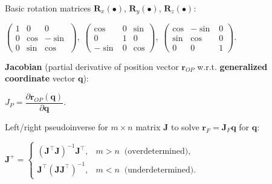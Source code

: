 \documentclass[8pt,landscape]{article}
\newcommand{\vmspace}{\vspace{-7pt}}
\newcommand{\vpspace}{\vspace{9pt}}
\begin{document}
\begin{multicols}{3}
\begin{minipage}{\columnwidth}
  Basic rotation matrices $\mathbf R_x(\bullet)$, $\mathbf R_y(\bullet)$, $\mathbf
  R_z(\bullet)$:
  \vmspace
  \begin{center}
    $\left(\begin{matrix}
      1 & 0 & 0 \\
      0 & \cos & -\sin \\
      0 & \sin & \cos
    \end{matrix}\right),\;
    \left(\begin{matrix}
      \cos & 0 & \sin \\
      0 & 1 & 0 \\
      -\sin & 0 & \cos
    \end{matrix}\right),\;
    \left(\begin{matrix}
      \cos & -\sin & 0 \\
      \sin & \cos & 0 \\
      0 & 0 & 1
    \end{matrix}\right).$
  \end{center}
\end{minipage}

\vpspace

\begin{minipage}{\columnwidth}
  \textbf{Jacobian} (partial derivative of position vector $\mathbf{r}_{OP}$
  w.r.t. \textbf{generalized coordinate} vector $\mathbf{q}$):
  \vmspace
  \begin{center}
    $J_P = \dfrac{\partial \mathbf{r}_{OP}(\mathbf q)}{\partial \mathbf q}$.
  \end{center}
\end{minipage}

\vpspace

\begin{minipage}{\columnwidth}
  Left/right pseudoinverse for $m \times n$ matrix $\mathbf{J}$ to solve
  $\mathbf r_F = \mathbf J_F \mathbf q$ for $\mathbf q$:
  \vmspace
  \begin{center}
    $\mathbf{J}^+=
    \begin{cases}
      (\mathbf{J}^\intercal \mathbf J)^{-1} \mathbf J^\intercal, & m>n\;\;
      \text{(overdetermined)},\\
      \mathbf J^\intercal (\mathbf{J} \mathbf J^\intercal)^{-1}, & m<n\;\;
      \text{(underdetermined).}
    \end{cases}$
  \end{center}
\end{minipage}


\end{multicols}
\end{document}
